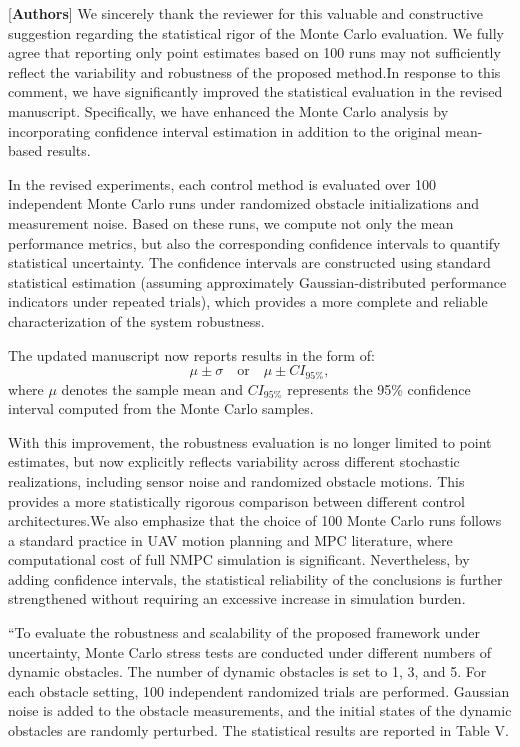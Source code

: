 \documentclass[12pt, twosides]{article}
\theoremstyle{definition}
\begin{document}
\textcolor[rgb]{0.00,0.00,1.00}{[\textbf{Authors}]} We sincerely thank the reviewer for this valuable and constructive suggestion regarding the statistical rigor of the Monte Carlo evaluation. We fully agree that reporting only point estimates based on 100 runs may not sufficiently reflect the variability and robustness of the proposed method.In response to this comment, we have significantly improved the statistical evaluation in the revised manuscript. Specifically, we have enhanced the Monte Carlo analysis by incorporating confidence interval estimation in addition to the original mean-based results.

In the revised experiments, each control method is evaluated over 100 independent Monte Carlo runs under randomized obstacle initializations and measurement noise. Based on these runs, we compute not only the mean performance metrics, but also the corresponding confidence intervals to quantify statistical uncertainty. The confidence intervals are constructed using standard statistical estimation (assuming approximately Gaussian-distributed performance indicators under repeated trials), which provides a more complete and reliable characterization of the system robustness.

The updated manuscript now reports results in the form of:
\[
\mu \pm \sigma \quad \text{or} \quad \mu \pm CI_{95\%},
\]
where $\mu$ denotes the sample mean and $CI_{95\%}$ represents the 95\% confidence interval computed from the Monte Carlo samples.

With this improvement, the robustness evaluation is no longer limited to point estimates, but now explicitly reflects variability across different stochastic realizations, including sensor noise and randomized obstacle motions. This provides a more statistically rigorous comparison between different control architectures.We also emphasize that the choice of 100 Monte Carlo runs follows a standard practice in UAV motion planning and MPC literature, where computational cost of full NMPC simulation is significant. Nevertheless, by adding confidence intervals, the statistical reliability of the conclusions is further strengthened without requiring an excessive increase in simulation burden.

``To evaluate the robustness and scalability of the proposed framework under uncertainty, Monte Carlo stress tests are conducted under different numbers of dynamic obstacles. The number of dynamic obstacles is set to 1, 3, and 5. For each obstacle setting, 100 independent randomized trials are performed. Gaussian noise is added to the obstacle measurements, and the initial states of the dynamic obstacles are randomly perturbed. The statistical results are reported in Table V.
\end{document}
